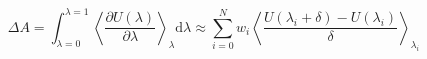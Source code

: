 


\[ \Delta A = \int_{\lambda=0}^{\lambda=1} \left< \frac{\partial
    U(\lambda)}{\partial\lambda} \right>_\lambda \mathrm{d}\lambda
\approx \sum_{i=0}^N w_i \left< \frac{U(\lambda_{i} + \delta) -
    U(\lambda_i)}{\delta} \right>_{\lambda_i} \]


